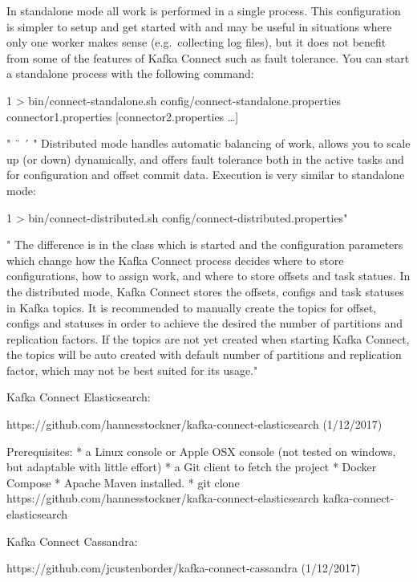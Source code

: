 \documentclass[]{article}
\begin{document}
In standalone mode all work is performed in a single process. This
configuration is simpler to setup and get started with and may be useful
in situations where only one worker makes sense (e.g.~collecting log
files), but it does not benefit from some of the features of Kafka
Connect such as fault tolerance. You can start a standalone process with
the following command:

1 \textgreater{} bin/connect-standalone.sh
config/connect-standalone.properties connector1.properties
{[}connector2.properties \ldots{}{]}

" ¨ ´ " Distributed mode handles automatic balancing of work, allows you
to scale up (or down) dynamically, and offers fault tolerance both in
the active tasks and for configuration and offset commit data. Execution
is very similar to standalone mode:

1 \textgreater{} bin/connect-distributed.sh
config/connect-distributed.properties"

" The difference is in the class which is started and the configuration
parameters which change how the Kafka Connect process decides where to
store configurations, how to assign work, and where to store offsets and
task statues. In the distributed mode, Kafka Connect stores the offsets,
configs and task statuses in Kafka topics. It is recommended to manually
create the topics for offset, configs and statuses in order to achieve
the desired the number of partitions and replication factors. If the
topics are not yet created when starting Kafka Connect, the topics will
be auto created with default number of partitions and replication
factor, which may not be best suited for its usage."

Kafka Connect Elasticsearch:

https://github.com/hannesstockner/kafka-connect-elasticsearch
(1/12/2017)

Prerequisites: * a Linux console or Apple OSX console (not tested on
windows, but adaptable with little effort) * a Git client to fetch the
project * Docker Compose * Apache Maven installed. * git clone
https://github.com/hannesstockner/kafka-connect-elasticsearch
kafka-connect-elasticsearch

Kafka Connect Cassandra:

https://github.com/jcustenborder/kafka-connect-cassandra (1/12/2017)
\end{document}
